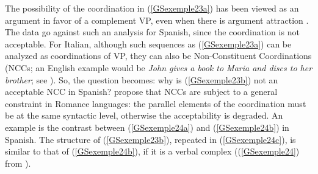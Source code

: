 {The possibility of the coordination in (\ref{GSexemple23a}) has been viewed as an argument in favor
of a complement VP, even when there is argument attraction \citep{andrews1999complex}. The data go
against such an analysis for Spanish, since the coordination is not acceptable. For Italian,
although such sequences as (\ref{GSexemple23a}) can be analyzed as coordinations of VP, they can
also be Non-Constituent Coordinations (NCCs; an English example would be \emph{John gives a book to Maria and discs to her brother}; see ). 
So, the question becomes: why is (\ref{GSexemple23b}) not an acceptable NCC in Spanish?
\cite{AG2010} propose that NCCs are subject to a general constraint in Romance
languages: the parallel elements of the coordination must be at the same syntactic level, otherwise
the acceptability is degraded. An example is the contrast between (\ref{GSexemple24a}) and
(\ref{GSexemple24b}) in Spanish. The structure of (\ref{GSexemple23b}), repeated in
(\ref{GSexemple24c}), is similar to that of (\ref{GSexemple24b}), if it is a verbal complex ((\ref{GSexemple24}) from \citealt[137, 144]{AG2010}).

\eal
	\label{GSexemple24} 
	\label{GSexemple24a}
	
	\label{GSexemple24b}
	
	\label{GSexemple24c}
\zl

}

